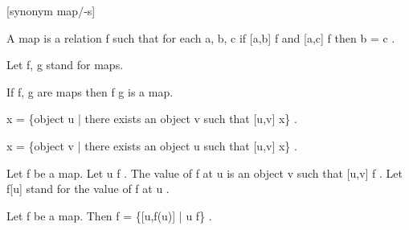 \documentclass[a4paper,draft]{amsproc}
\begin{document}
\begin{forthel}



[synonym map/-s]
\begin{definition}
A map is a relation  f  such that for each  a, b, c 
if  [a,b] \in f  and  [a,c] \in f  then  b = c .
\end{definition}

Let  f, g  stand for maps.

\begin{theorem}
If  f, g  are maps then  f \circ g  is a map.
\end{theorem}

\begin{definition}
 \domain x = \{object u |   there exists an object  v  such that  [u,v] \in x\} .
\end{definition}

\begin{definition}
 \range x = \{object v |   there exists an object  u  such that  [u,v] \in x\} .
\end{definition}


\begin{signature}
Let  f  be a map. Let  u \in \domain f .
The value of  f  at  u  is an object  v  such that  [u,v] \in f .
Let  f[u]  stand for the value of  f  at  u .
\end{signature}


\begin{theorem}
Let  f  be a map. Then  f = \{[u,f(u)] | u \in \domain f\} .
\end{theorem}


\end{forthel}
\end{document}
